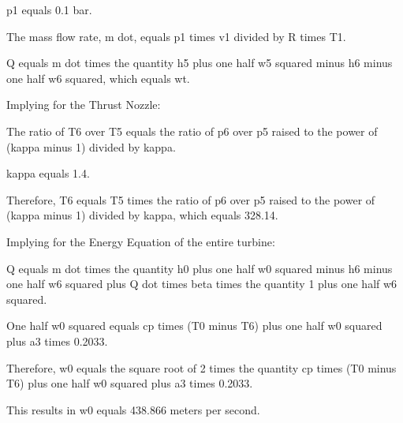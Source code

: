 p1 equals 0.1 bar.

The mass flow rate, m dot, equals p1 times v1 divided by R times T1.

Q equals m dot times the quantity h5 plus one half w5 squared minus h6 minus one half w6 squared, which equals wt.

Implying for the Thrust Nozzle:

The ratio of T6 over T5 equals the ratio of p6 over p5 raised to the power of (kappa minus 1) divided by kappa.

kappa equals 1.4.

Therefore, T6 equals T5 times the ratio of p6 over p5 raised to the power of (kappa minus 1) divided by kappa, which equals 328.14.

Implying for the Energy Equation of the entire turbine:

Q equals m dot times the quantity h0 plus one half w0 squared minus h6 minus one half w6 squared plus Q dot times beta times the quantity 1 plus one half w6 squared.

One half w0 squared equals cp times (T0 minus T6) plus one half w0 squared plus a3 times 0.2033.

Therefore, w0 equals the square root of 2 times the quantity cp times (T0 minus T6) plus one half w0 squared plus a3 times 0.2033.

This results in w0 equals 438.866 meters per second.